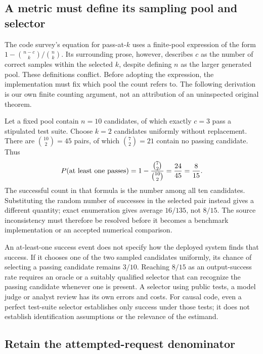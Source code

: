 \subsection{A metric must define its sampling pool and selector}
\label{exec19:evalcode-selection}

The code survey's equation for pass-at-$k$ uses a finite-pool expression of the
form $1-\binom{n-c}{k}/\binom{n}{k}$. Its surrounding prose, however, describes
$c$ as the number of correct samples within the selected $k$, despite defining
$n$ as the larger generated pool. These definitions conflict. Before adopting
the expression, the implementation must fix which pool the count refers to.
The following derivation is our own finite counting argument, not an attribution
of an uninspected original theorem.~\citep{exec19_surveys_code}

Let a fixed pool contain $n=10$ candidates, of which exactly $c=3$ pass a
stipulated test suite. Choose $k=2$ candidates uniformly without replacement.
There are $\binom{10}{2}=45$ pairs, of which $\binom72=21$ contain no passing
candidate. Thus
\begin{equation}
 P(\hbox{at least one passes})
 =1-\frac{\binom72}{\binom{10}2}=\frac{24}{45}=\frac8{15}.
 \label{exec19:evalcode-pool}
\end{equation}
The successful count in that formula is the number among all ten candidates.
Substituting the random number of successes in the selected pair instead gives
a different quantity; exact enumeration gives average $16/135$, not $8/15$.
The source inconsistency must therefore be resolved before it becomes a
benchmark implementation or an accepted numerical comparison.
\citep{exec19_surveys_reference}

An at-least-one success event does not specify how the deployed system finds
that success. If it chooses one of the two sampled candidates uniformly,
its chance of selecting a passing candidate remains $3/10$. Reaching $8/15$
as an output-success rate requires an oracle or a suitably qualified selector
that can recognize the passing candidate whenever one is present. A selector
using public tests, a model judge or analyst review has its own errors and
costs. For causal code, even a perfect test-suite selector establishes only
success under those tests; it does not establish identification assumptions or
the relevance of the estimand.~\citep{exec19_surveys_reference}

\subsection{Retain the attempted-request denominator}
\label{exec19:evalcode-pipeline}

